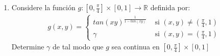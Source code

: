 \documentclass[letterpaper,11pt]{article}
\begin{document}
\begin{enumerate}
\begin{enumerate}
\begin{align*}
\begin{array}{cl}
                    1 &\text{ si } (x,y)=(0,0)
                \end{array}\right.
        \end{align*}
            Estudie la continuidad de $f$ en $\mathbb{R}^2$
        \item Considere la función $g:\left[0,\frac{\pi}{4}\right]\times[0,1]\rightarrow\mathbb{R}$ definida por:
        \begin{align*}
            \displaystyle g(x,y)=\left\{
                \begin{array}{cl}
                    tan(xy)^{\frac{1}{1-tan(xy)}}&\text{ si } (x,y)\neq\left(\frac{\pi}{4},1\right) \\
                    \gamma &\text{ si } (x,y)=\left(\frac{\pi}{4},1\right)
                \end{array}\right.
        \end{align*}
        Determine $\gamma$ de tal modo que $g$ sea continua en $\left[0,\frac{\pi}{4}\right]\times[0,1]$
    \end{enumerate}

\end{enumerate}
\end{document}
